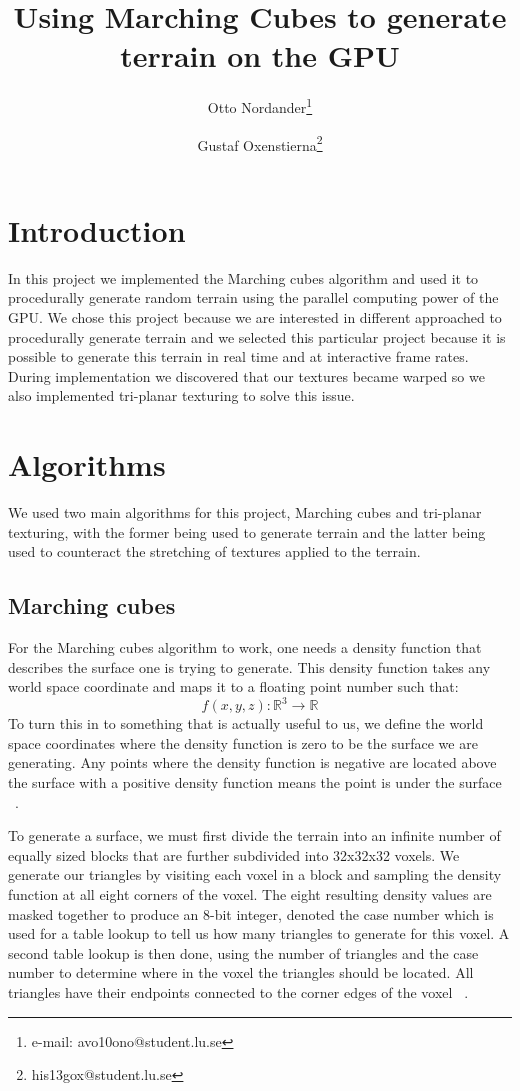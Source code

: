 \documentclass{acmsiggraph}               %
\title{Using Marching Cubes to generate terrain on the GPU}
\author{Otto Nordander\thanks{e-mail: avo10ono@student.lu.se} \and Gustaf Oxenstierna\thanks{his13gox@student.lu.se}
}
\affiliation{Lund University\\ Sweden}
\begin{document}
\ifpdf
\else
\fi


\maketitle

\begin{abstract}
\end{abstract}


\section{Introduction}
In this project we implemented the Marching cubes algorithm and used it to procedurally
generate random terrain using the parallel computing power of the GPU. We chose this project
because we are interested in different approached to procedurally generate terrain and we selected
this particular project because it is possible to generate this terrain in real time and at
interactive frame rates. During implementation we discovered that our textures became warped
so we also implemented tri-planar texturing to solve this issue.
\section{Algorithms}
We used two main algorithms for this project, Marching cubes and tri-planar texturing, with
the former being used to generate terrain and the latter being used to counteract the stretching
of textures applied to the terrain.
\subsection{Marching cubes}
For the Marching cubes algorithm to work, one needs a density function that describes the surface
one is trying to generate. This density function takes any world space coordinate and maps it to
a floating point number such that:
$$ f(x,y,z) : \mathbb{R}^{3} \rightarrow \mathbb{R} $$
To turn this in to something that is actually useful to us, we define the world space coordinates
where the density function is zero to be the surface we are generating. Any points where the density 
function is negative are located above the surface with a positive density function means the point
is under the surface ~\cite{Geiss}.

To generate a surface, we must first divide the terrain into an infinite number of equally sized
blocks that are further subdivided into 32x32x32 voxels. We generate our triangles by visiting
each voxel in a block and sampling the density function at all eight corners of the voxel. The
eight resulting density values are masked together to produce an 8-bit integer, denoted the case number which is used
for a table lookup to tell us how many triangles to generate for this voxel. A second table
lookup is then done, using the number of triangles and the case number to determine where in the
voxel the triangles should be located. All triangles have their endpoints connected to the corner
edges of the voxel ~\cite{Geiss}.
\end{document}
